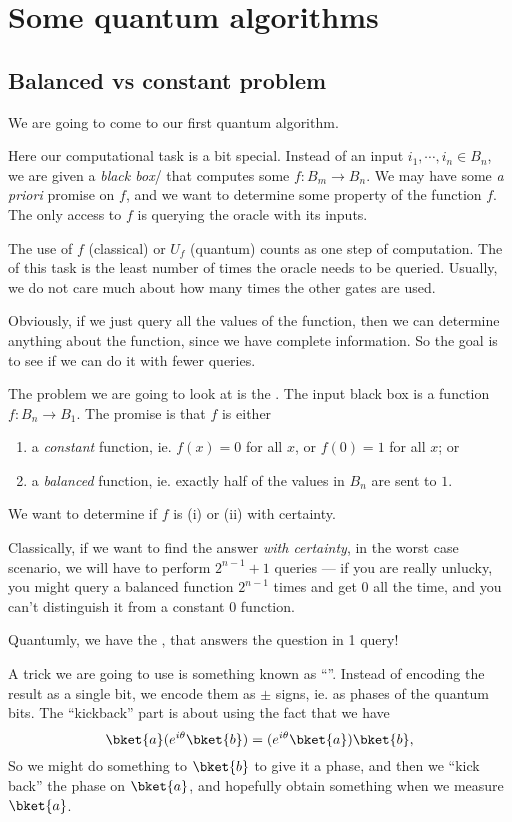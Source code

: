 \documentclass[a4paper]{article}
\begin{document}
\section{Some quantum algorithms}
\subsection{Balanced vs constant problem}
We are going to come to our first quantum algorithm.

Here our computational task is a bit special. Instead of an input $i_1, \cdots, i_n \in B_n$, we are given a \emph{black box}/ that computes some $f: B_m \to B_n$. We may have some \emph{a priori} promise on $f$, and we want to determine some property of the function $f$. The only access to $f$ is querying the oracle with its inputs.

The use of $f$ (classical) or $U_f$ (quantum) counts as one step of computation. The  of this task is the least number of times the oracle needs to be queried. Usually, we do not care much about how many times the other gates are used.

Obviously, if we just query all the values of the function, then we can determine anything about the function, since we have complete information. So the goal is to see if we can do it with fewer queries.

The problem we are going to look at is the . The input black box is a function $f: B_n \to B_1$. The promise is that $f$ is either
\begin{enumerate}
  \item a \emph{constant} function, ie. $f(x) = 0$ for all $x$, or $f(0) = 1$ for all $x$; or
  \item a \emph{balanced} function, ie. exactly half of the values in $B_n$ are sent to $1$.
\end{enumerate}
We want to determine if $f$ is (i) or (ii) with certainty.

Classically, if we want to find the answer \emph{with certainty}, in the worst case scenario, we will have to perform $2^{n - 1} + 1$ queries --- if you are really unlucky, you might query a balanced function $2^{n - 1}$ times and get $0$ all the time, and you can't distinguish it from a constant $0$ function.

Quantumly, we have the , that answers the question in 1 query!

A trick we are going to use is something known as ``''. Instead of encoding the result as a single bit, we encode them as $\pm$ signs, ie. as phases of the quantum bits. The ``kickback'' part is about using the fact that we have
\[
  \bket{a} (e^{i\theta}\bket{b}) = (e^{i\theta}\bket{a})\bket{b},
\]
So we might do something to $\bket{b}$ to give it a phase, and then we ``kick back'' the phase on $\bket{a}$, and hopefully obtain something when we measure $\bket{a}$.
\end{document}
